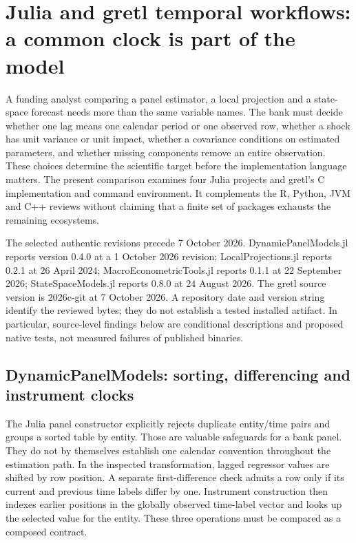 \section{Julia and gretl temporal workflows: a common clock is part of the model}
\label{sec:exec25-other-dynamic}

A funding analyst comparing a panel estimator, a local projection and a state-space forecast needs more than the same variable names. The bank must decide whether one lag means one calendar period or one observed row, whether a shock has unit variance or unit impact, whether a covariance conditions on estimated parameters, and whether missing components remove an entire observation. These choices determine the scientific target before the implementation language matters. The present comparison examines four Julia projects and gretl's C implementation and command environment. It complements the R, Python, JVM and C++ reviews without claiming that a finite set of packages exhausts the remaining ecosystems.

The selected authentic revisions precede 7 October 2026. DynamicPanelModels.jl reports version 0.4.0 at a 1 October 2026 revision; LocalProjections.jl reports 0.2.1 at 26 April 2024; MacroEconometricTools.jl reports 0.1.1 at 22 September 2026; StateSpaceModels.jl reports 0.8.0 at 24 August 2026. The gretl source version is 2026c-git at 7 October 2026. A repository date and version string identify the reviewed bytes; they do not establish a tested installed artifact. In particular, source-level findings below are conditional descriptions and proposed native tests, not measured failures of published binaries.\citep{exec25_odyn_dpm,exec25_odyn_lp,exec25_odyn_macro,exec25_odyn_ssm,exec25_odyn_gretl}

\subsection{DynamicPanelModels: sorting, differencing and instrument clocks}

The Julia panel constructor explicitly rejects duplicate entity/time pairs and groups a sorted table by entity. Those are valuable safeguards for a bank panel. They do not by themselves establish one calendar convention throughout the estimation path. In the inspected transformation, lagged regressor values are shifted by row position. A separate first-difference check admits a row only if its current and previous time labels differ by one. Instrument construction then indexes earlier positions in the globally observed time-label vector and looks up the selected value for the entity. These three operations must be compared as a composed contract.\citep{exec25_odyn_dpm}

